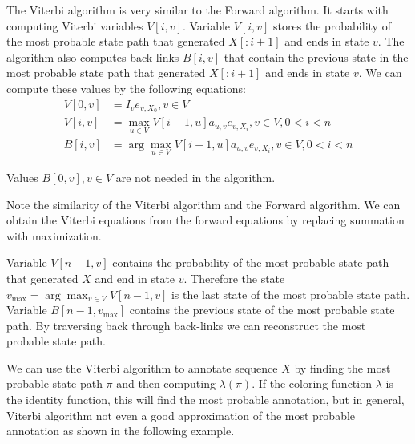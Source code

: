 The Viterbi algorithm is very similar to the  Forward algorithm. It starts with computing
Viterbi variables $V[i,v]$. Variable $V[i,v]$ stores the probability of the most probable 
state path that generated $X[:i+1]$ and ends in state $v$. The algorithm
also computes back-links $B[i,v]$ that contain the previous state in the most
probable state path that generated $X[:i+1]$ and ends in state $v$. We can
compute these values by the following equations:
\begin{align}
V[0,v] &= I_{v}e_{v,X_0}, v\in V\\
V[i,v] &= \max_{u\in V} V[i-1,u]a_{u,v}e_{v,X_i}, v\in V,0<i<n\\
B[i,v] &= \arg\max_{u\in V} V[i-1,u]a_{u,v}e_{v,X_i}, v\in V,0<i<n
\end{align}
\begin{note}
Values $B[0,v],v\in V$ are not needed in the algorithm.

Note the similarity of the Viterbi algorithm and the Forward algorithm.
We can obtain the Viterbi equations from the forward equations by replacing
summation with
maximization.
\end{note}

Variable $V[n-1,v]$ contains the probability of the most probable state path
that generated $X$ and end in state $v$. Therefore the state $v_{\max} =
\arg\max_{v\in V}V[n-1,v]$ is the last state of the most probable state path.
Variable $B[n-1,v_{\max}]$ contains the previous state of the most probable
state path. By traversing back through back-links  we can reconstruct the most
probable state path.


We can use the Viterbi algorithm to annotate sequence $X$ by finding the most
probable state path $\pi$ and then computing $\lambda(\pi)$. If the  coloring
function $\lambda$ is the identity function, this will find the most probable
annotation, but in general, Viterbi algorithm not even a good approximation of
the most probable annotation as shown in the following example.

